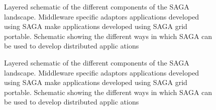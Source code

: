 \documentclass[conference,final]{IEEEtran}
\begin{document}
\begin{figure}[!h]
  \begin{center}
  \end{center}
  \caption{Layered schematic of the different components of the SAGA
    landscape.  Middleware specific adaptors applications developed
    using SAGA make applications developed using SAGA grid
    portable. Schematic showing the different ways in which SAGA can
    be used to develop distributed applic ations}
 \label{sagalayer}
\end{figure}


\begin{figure}[!h]
  \begin{center}
  \end{center}
  \caption{Layered schematic of the different components of the SAGA
    landscape.  Middleware specific adaptors applications developed
    using SAGA make applications developed using SAGA grid
    portable. Schematic showing the different ways in which SAGA can
    be used to develop distributed applic ations}
 \label{sagalayer}
\end{figure}
\end{document}
